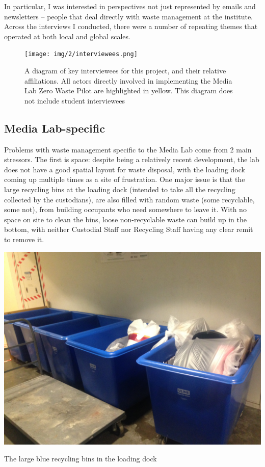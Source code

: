 \documentclass[nofonts,nols,justified,nobib]{tufte-book}
\begin{document}
In particular, I was interested in perspectives not just represented by emails and newsletters -- people that deal directly with waste management at the institute. Across the interviews I conducted, there were a number of repeating themes that operated at both local and global scales.

\begin{figure}
  \caption{A diagram of key interviewees for this project, and their relative affiliations. All actors directly involved in implementing the Media Lab Zero Waste Pilot are highlighted in yellow. This diagram does not include student interviewees}
  \texttt{[image: img/2/interviewees.png]}
\end{figure}

\subsection*{Media Lab-specific}

Problems with waste management specific to the Media Lab come from 2 main stressors. The first is space: despite being a relatively recent development, the lab does not have a good spatial layout for waste disposal, with the loading dock coming up multiple times as a site of frustration. One major issue is that the large recycling bins at the loading dock (intended to take all the recycling collected by the custodians), are also filled with random waste (some recyclable, some not), from building occupants who need somewhere to leave it. With no space on site to clean the bins, loose non-recyclable waste can build up in the bottom, with neither Custodial Staff nor Recycling Staff having any clear remit to remove it.

\begin{marginfigure}
  \includegraphics[width=1\linewidth]{img/2/mit-bins/loading4.JPG}
  \caption{The large blue recycling bins in the loading dock}
\end{marginfigure}
\end{document}
